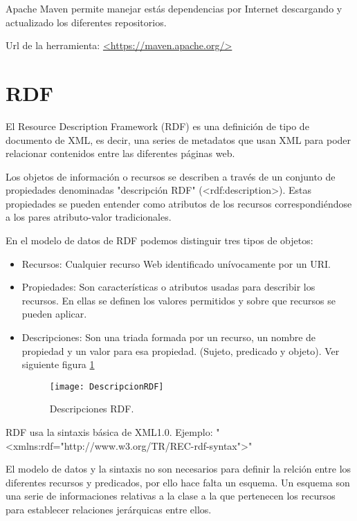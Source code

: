 Apache Maven permite manejar estás dependencias por Internet descargando y actualizado los diferentes repositorios.\cite{wiki:maven}

Url de la herramienta: \url{<https://maven.apache.org/>}

\section{RDF}

El Resource Description Framework (RDF) es una definición de tipo de documento de XML, es decir, una series de metadatos que usan XML para poder relacionar contenidos entre las diferentes páginas web.

Los objetos de información o recursos se describen a través de un conjunto de propiedades denominadas "descripción RDF" (<rdf:description>). Estas propiedades se pueden entender como atributos de los recursos correspondiéndose a los pares atributo-valor tradicionales.

En el modelo de datos de RDF podemos distinguir tres tipos de objetos:

\begin{itemize}
	\item{Recursos}: Cualquier recurso Web identificado unívocamente por un URI.
	\item{Propiedades}: Son características o atributos usadas para describir los recursos. En ellas se definen los valores permitidos y sobre que recursos se pueden aplicar.
	\item{Descripciones}: Son una triada formada por un recurso, un nombre de propiedad y un valor para esa propiedad. (Sujeto, predicado y objeto).
Ver siguiente figura \ref{figDescripcionRDF}

\begin{figure}[h]
    \begin{center}%
        \begin{center}%
          \texttt{[image: DescripcionRDF]}%
          \caption{Descripciones RDF.}%
          \label{figDescripcionRDF}%
        \end{center}%
  	\end{center}%
\end{figure}%

\end{itemize}

\newpage
RDF usa la sintaxis básica de XML1.0. Ejemplo: "<xmlns:rdf="http://www.w3.org/TR/REC-rdf-syntax">"

El modelo de datos y la sintaxis no son necesarios para definir la relción entre los diferentes recursos y predicados, por ello hace falta un esquema.
Un esquema son una serie de informaciones relativas a la clase a la que pertenecen los recursos para establecer relaciones jerárquicas entre ellos.

